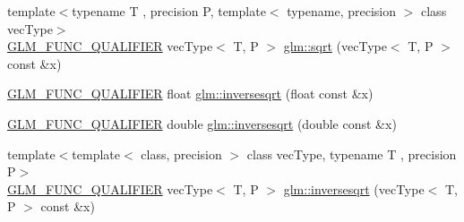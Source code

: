 \begin{DoxyCompactItemize}
\item 
{\footnotesize template$<$typename T , precision P, template$<$ typename, precision $>$ class vec\+Type$>$ }\\\hyperlink{setup_8hpp_a33fdea6f91c5f834105f7415e2a64407}{G\+L\+M\+\_\+\+F\+U\+N\+C\+\_\+\+Q\+U\+A\+L\+I\+F\+I\+ER} vec\+Type$<$ T, P $>$ \hyperlink{group__core__func__exponential_ga2ea6c6738ad6e09ec3405a628047801b}{glm\+::sqrt} (vec\+Type$<$ T, P $>$ const \&x)
\item 
\hyperlink{setup_8hpp_a33fdea6f91c5f834105f7415e2a64407}{G\+L\+M\+\_\+\+F\+U\+N\+C\+\_\+\+Q\+U\+A\+L\+I\+F\+I\+ER} float \hyperlink{namespaceglm_af2e9f33f212954ecca568cf1485ccbe8}{glm\+::inversesqrt} (float const \&x)
\item 
\hyperlink{setup_8hpp_a33fdea6f91c5f834105f7415e2a64407}{G\+L\+M\+\_\+\+F\+U\+N\+C\+\_\+\+Q\+U\+A\+L\+I\+F\+I\+ER} double \hyperlink{namespaceglm_a83786622d7ff4afca48a9c730b4cabf4}{glm\+::inversesqrt} (double const \&x)
\item 
{\footnotesize template$<$template$<$ class, precision $>$ class vec\+Type, typename T , precision P$>$ }\\\hyperlink{setup_8hpp_a33fdea6f91c5f834105f7415e2a64407}{G\+L\+M\+\_\+\+F\+U\+N\+C\+\_\+\+Q\+U\+A\+L\+I\+F\+I\+ER} vec\+Type$<$ T, P $>$ \hyperlink{namespaceglm_a3f7480375deccaf2afd47faa620d5fd8}{glm\+::inversesqrt} (vec\+Type$<$ T, P $>$ const \&x)
\end{DoxyCompactItemize}
